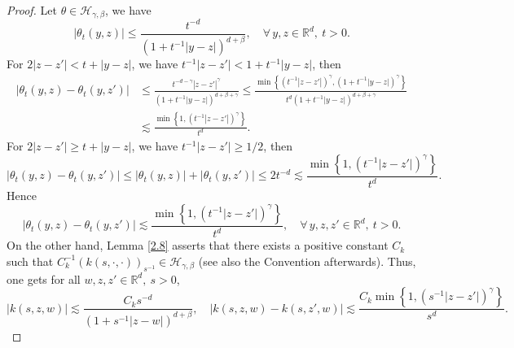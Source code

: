 \documentclass[oneside,english,a4wide]{amsart}
\numberwithin{equation}{section}
\numberwithin{figure}{section}
\theoremstyle{plain}
\theoremstyle{plain}
\theoremstyle{definition}
\theoremstyle{plain}
\theoremstyle{remark}
\theoremstyle{definition}
\theoremstyle{remark}
\theoremstyle{definition}
\newcommand{\real}{{\mathbb R}}
\newcommand{\8}{+\infty}
\renewcommand{\1}{\mathbbm{1}}
\newcommand\sk[1]{ \left( #1 \right) }
\newcommand\lk[1]{ \left\{ #1 \right\} }
\begin{document}
{\begin{proof}
Let $\theta \in \mathcal{H}_{\gamma, \beta}$, we have
    \begin{equation}\label{theta1}
        |\theta_t(y, z)| \leq \frac{ t^{-d}}{(1 + t^{-1}|y - z|)^{d + \beta}}, \quad \forall \, y, z \in \real^d,\ t> 0.
    \end{equation}
    For $ 2|z - z'| < t + |y- z|$, we have 
    $t^{-1}|z - z'| < 1 + t^{-1}|y - z|$, then
    \[
    \begin{aligned}
        |\theta_t(y, z) - \theta_t(y, z')| & \leq \frac{ t^{-d-\gamma}|z - z'|^\gamma}{(1+ t^{-1}|y - z|)^{d + \beta + \gamma}} \leq \frac{\min\lk{ (t^{-1}|z - z'|)^\gamma, \sk{1 + t^{-1}|y - z|}^\gamma } }{t^d(1+ t^{-1}|y - z|)^{d + \beta + \gamma}} \\
        & \lesssim \frac{ \min\lk{ 1, (t^{-1}|z-z'|)^{\gamma} } }{t^d}.
    \end{aligned}
    \]    
    For $ 2|z - z'| \geq t + |y- z|$, we have $ t^{-1}|z - z'| \geq 1/2$, then
    \[
        |\theta_t(y, z) - \theta_t(y, z')| \leq |\theta_t(y, z)| + |\theta_t(y, z')| \leq 2 t^{-d}\lesssim \frac{ \min\lk{ 1, (t^{-1}|z-z'|)^{\gamma} } }{t^d}.
    \]
    Hence
    \[
        |\theta_t(y, z) - \theta_t(y, z')| \lesssim \frac{ \min\lk{ 1, (t^{-1}|z-z'|)^{\gamma} } }{t^d}, \quad\forall\, y, z, z' \in \real^d,\ t > 0.
    \]
    On the other hand, Lemma \ref{2.8} asserts that there exists a positive constant $C_k$ such that $ C_k^{-1}(k(s, \cdot, \cdot))_{s^{-1}} \in \mathcal{H}_{\gamma, \beta} $ (see also the {Convention} afterwards). Thus, one gets for all $ w, z, z' \in \real^d,\ s > 0$,
    \[
        |k(s, z, w)| \lesssim \frac{C_k s^{-d}}{(1 + s^{-1}|z - w|)^{d + \beta}}, \quad |k(s, z, w) - k(s, z', w)| \lesssim \frac{ C_k\min\lk{ 1, (s^{-1}|z - z'|)^{\gamma} } }{s^d}.
    \]
    

\end{proof}}
\end{document}
